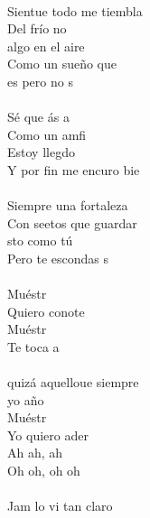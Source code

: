\begin{cancion}%
	     \chord{(}{**)}{    }\\
	Sientue todo me tiembla \\
	Del frío no \\
	 algo en el aire\\
Como un sueño que \\
	es pero no s\\
\jump\\
	Sé que ás a\\
	Como un amfi\\
	Estoy llegdo\\
	Y por fin me encuro bie\\
\jump\\
	Siempre  una fortaleza\\
	Con seetos que guardar\\
	sto como tú\\
	Pero  te escondas s\\
\jump\\
	Muéstr \\
	Quiero conote\\
	Muéstr \\
	Te toca a \\
\jump\\
	 quizá aquelloue siempre\\
	yo año    \\
	Muéstr \\
	Yo quiero ader\\
	Ah ah, ah     \\
	Oh oh, oh oh \\
\jump\\
	Jam lo vi tan claro     \\

\end{cancion}
